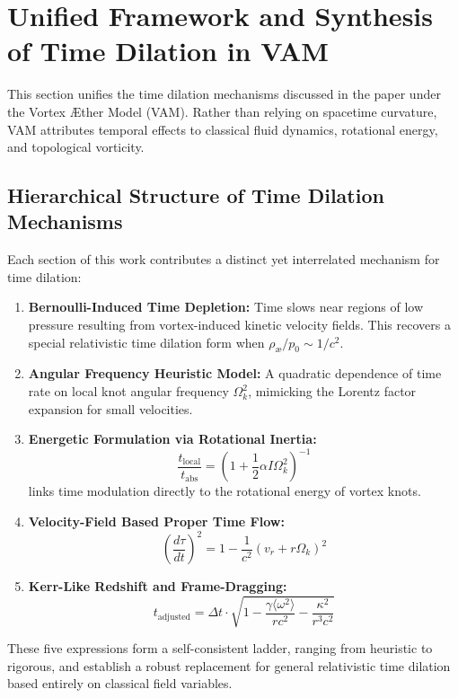 \section{Unified Framework and Synthesis of Time Dilation in VAM}

This section unifies the time dilation mechanisms discussed in the paper under the Vortex Æther Model (VAM). Rather than relying on spacetime curvature, VAM attributes temporal effects to classical fluid dynamics, rotational energy, and topological vorticity.

\subsection{Hierarchical Structure of Time Dilation Mechanisms}

Each section of this work contributes a distinct yet interrelated mechanism for time dilation:

\begin{enumerate}
    \item \textbf{Bernoulli-Induced Time Depletion:} Time slows near regions of low pressure resulting from vortex-induced kinetic velocity fields. This recovers a special relativistic time dilation form when \( \rho_{\text{\ae}} / p_0 \sim 1/c^2 \).

    \item \textbf{Angular Frequency Heuristic Model:} A quadratic dependence of time rate on local knot angular frequency \( \Omega_k^2 \), mimicking the Lorentz factor expansion for small velocities.

    \item \textbf{Energetic Formulation via Rotational Inertia:}
    \[
        \boxed{\frac{t_{\text{local}}}{t_{\text{abs}}} = \left(1 + \frac{1}{2} \alpha I \Omega_k^2 \right)^{-1}}
    \]
    links time modulation directly to the rotational energy of vortex knots.

    \item \textbf{Velocity-Field Based Proper Time Flow:}
    \[
        \boxed{\left( \frac{d\tau}{dt} \right)^2 = 1 - \frac{1}{c^2}(v_r + r\Omega_k)^2}
    \]

    \item \textbf{Kerr-Like Redshift and Frame-Dragging:}
    \[
        \boxed{t_{\text{adjusted}} = \Delta t \cdot \sqrt{1 - \frac{\gamma \langle \omega^2 \rangle}{rc^2} - \frac{\kappa^2}{r^3c^2}}}
    \]
\end{enumerate}

These five expressions form a self-consistent ladder, ranging from heuristic to rigorous, and establish a robust replacement for general relativistic time dilation based entirely on classical field variables.

